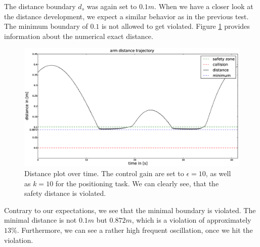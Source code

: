 The distance boundary $d_s$ was again set to $0.1m$. When we have a closer look at the distance development, we expect a similar behavior as in the previous test. The minimum boundary of $0.1$ is not allowed to get violated. 
Figure \ref{fig:objmovesdistance} provides information about the numerical exact distance. 
\begin{figure}
  \centering
    \includegraphics[width=\textwidth]{../figures/object_moves/distance.eps}
    \caption{Distance plot over time. The control gain are set to $\epsilon=10$, as well as $k=10$ for the positioning task. We can clearly see, that the safety distance is violated.}
    \label{fig:objmovesdistance}
\end{figure}

Contrary to our expectations, we see that the minimal boundary is violated. The minimal distance is not $0.1m$ but $0.872m$, which is a violation of approximately $13\%$. Furthermore, we can see a rather high frequent oscillation, once we hit the violation. 

